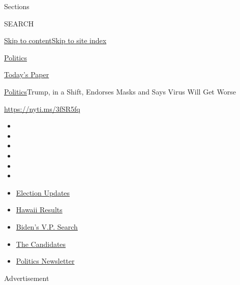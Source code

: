 Sections

SEARCH

\protect\hyperlink{site-content}{Skip to
content}\protect\hyperlink{site-index}{Skip to site index}

\href{https://www.nytimes.com/section/politics}{Politics}

\href{https://myaccount.nytimes.com/auth/login?response_type=cookie\&client_id=vi}{}

\href{https://www.nytimes.com/section/todayspaper}{Today's Paper}

\href{/section/politics}{Politics}\textbar{}Trump, in a Shift, Endorses
Masks and Says Virus Will Get Worse

\href{https://nyti.ms/3fSR5fq}{https://nyti.ms/3fSR5fq}

\begin{itemize}
\item
\item
\item
\item
\item
\item
\end{itemize}

\begin{itemize}
\item
  \href{https://www.nytimes.com/2020/08/07/us/elections/biden-vs-trump.html?action=click\&pgtype=Article\&state=default\&region=TOP_BANNER\&context=storylines_menu}{Election
  Updates}
\item
  \href{https://www.nytimes.com/interactive/2020/08/08/us/elections/results-hawaii-primary-elections.html?action=click\&pgtype=Article\&state=default\&region=TOP_BANNER\&context=storylines_menu}{Hawaii
  Results}
\item
  \href{https://www.nytimes.com/article/biden-vice-president-2020.html?action=click\&pgtype=Article\&state=default\&region=TOP_BANNER\&context=storylines_menu}{Biden's
  V.P. Search}
\item
  \href{https://www.nytimes.com/interactive/2019/us/politics/2020-presidential-candidates.html?action=click\&pgtype=Article\&state=default\&region=TOP_BANNER\&context=storylines_menu}{The
  Candidates}
\item
  \href{https://www.nytimes.com/newsletters/politics?action=click\&pgtype=Article\&state=default\&region=TOP_BANNER\&context=storylines_menu}{Politics
  Newsletter}
\end{itemize}

Advertisement

